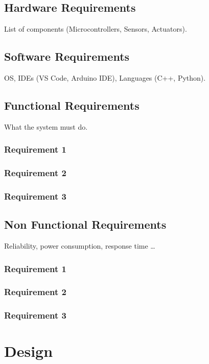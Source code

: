 \documentclass[minor, project]{gptcmdy}
\begin{document}
\section{Hardware Requirements}
List of components (Microcontrollers, Sensors, Actuators).

\section{Software Requirements}
OS, IDEs (VS Code, Arduino IDE), Languages (C++, Python).

\section{Functional Requirements}
What the system must do.

\subsection{Requirement 1}
\subsection{Requirement 2}
\subsection{Requirement 3}

\section{Non Functional Requirements}
Reliability, power consumption, response time \dots

\subsection{Requirement 1}
\subsection{Requirement 2}
\subsection{Requirement 3}









\chapter{Design}
\end{document}
